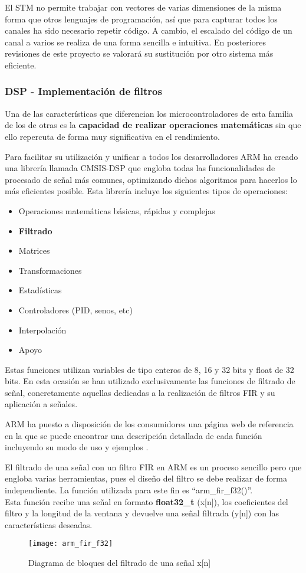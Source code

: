 El STM no permite trabajar con vectores de varias dimensiones de la misma forma que otros lenguajes de programación, así que para capturar todos los canales ha sido necesario repetir código. A cambio, el escalado del código de un canal a varios se realiza de una forma sencilla e intuitiva. En posteriores revisiones de este proyecto se valorará su sustitución por otro sistema más eficiente.

\subsubsection{DSP - Implementación de filtros \label{sec:Software_micro_DSP}}

Una de las características que diferencian los microcontroladores de esta familia de los de otras es la \textbf{capacidad de realizar operaciones matemáticas} sin que ello repercuta de forma muy significativa en el rendimiento. 

Para facilitar su utilización y unificar a todos los desarrolladores ARM ha creado una librería llamada CMSIS-DSP que engloba todas las funcionalidades de procesado de señal más comunes, optimizando dichos algoritmos para hacerlos lo más eficientes posible.
Esta librería incluye los siguientes tipos de operaciones:

\begin{itemize}
\item Operaciones matemáticas básicas, rápidas y complejas
\item \textbf{Filtrado}
\item Matrices
\item Transformaciones
\item Estadísticas
\item Controladores (PID, senos, etc)
\item Interpolación
\item Apoyo
\end{itemize}

Estas funciones utilizan variables de tipo enteros de 8, 16 y 32 bits y float de 32 bits. En esta ocasión se han utilizado exclusivamente las funciones de filtrado de señal, concretamente aquellas dedicadas a la realización de filtros FIR y su aplicación a señales.

ARM ha puesto a disposición de los consumidores una página web de referencia en la que se puede encontrar una descripción detallada de cada función incluyendo su modo de uso y ejemplos \cite{CMSIS-DSP}.

El filtrado de una señal con un filtro FIR en ARM es un proceso sencillo pero que engloba varias herramientas, pues el diseño del filtro se debe realizar de forma independiente. La función utilizada para este fin es ``arm\_fir\_f32()''. \\
Esta función recibe una señal en formato \textbf{float32\_t} (x[n]), los coeficientes del filtro y la longitud de la ventana y devuelve una señal filtrada (y[n]) con las características deseadas.
\begin{figure} [h]
    \centering
    \texttt{[image: arm\_fir\_f32]}
    \caption{Diagrama de bloques del filtrado de una señal x[n]}
    \label{fig:arm_fir_f32}
\end{figure}

